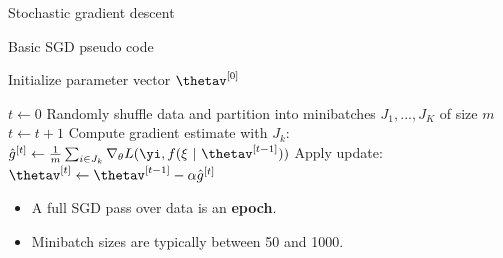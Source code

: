 
\begin{vbframe}{Stochastic gradient descent}

  \begin{algorithm}[H]
  \footnotesize
    \caption{Basic SGD pseudo code}
    \begin{algorithmic}[1]
    \State Initialize parameter vector $\thetav^{[0]}$ 
    
    \State $t \leftarrow 0$
    \State Randomly shuffle data and partition into minibatches $J_1, ..., J_K$ of size $m$
      \State $t \leftarrow t + 1$ 
      \State Compute gradient estimate with $J_k$: $\hat{g}^{[t]} \leftarrow \frac{1}{m} \sum_{i \in J_k} \nabla_\theta L(\yi, f(\xi ~|~ \thetav^{[t-1]})) $
      \State Apply update: $\thetav^{[t]} \leftarrow \thetav^{[t-1]} - \alpha \hat{g}^{[t]}$
      
      \EndFor
    
        
      \EndWhile
    \end{algorithmic}
  \end{algorithm}
  \begin{itemize}
    \item A full SGD pass over data is an \textbf{epoch}.
    \item Minibatch sizes are typically between 50 and 1000.
   \end{itemize}
 
\framebreak


\end{vbframe}
